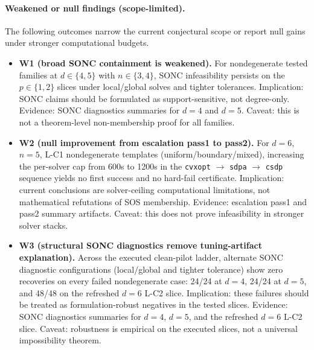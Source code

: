 \documentclass{article}
\begin{document}
\paragraph{Weakened or null findings (scope-limited).}
The following outcomes narrow the current conjectural scope or report null gains under stronger
computational budgets.
\begin{itemize}
    \item \textbf{W1 (broad SONC containment is weakened).}
    For nondegenerate tested families at $d\in\{4,5\}$ with $n\in\{3,4\}$,
    SONC infeasibility persists on the $p\in\{1,2\}$ slices under local/global solves and tighter
    tolerances.
    Implication: SONC claims should be formulated as support-sensitive, not degree-only.
    Evidence: SONC diagnostics summaries for $d=4$ and $d=5$.
    Caveat: this is not a theorem-level non-membership proof for all families.
    \item \textbf{W2 (null improvement from escalation pass1 to pass2).}
    For $d=6$, $n=5$, L-C1 nondegenerate templates (uniform/boundary/mixed),
    increasing the per-solver cap from 600s to 1200s in the
    \texttt{cvxopt} $\rightarrow$ \texttt{sdpa} $\rightarrow$ \texttt{csdp}
    sequence yields no first success and no hard-fail certificate.
    Implication: current conclusions are solver-ceiling computational limitations, not mathematical
    refutations of SOS membership.
    Evidence: escalation pass1 and pass2 summary artifacts.
    Caveat: this does not prove infeasibility in stronger solver stacks.
    \item \textbf{W3 (structural SONC diagnostics remove tuning-artifact explanation).}
    Across the executed clean-pilot ladder, alternate SONC diagnostic configurations
    (local/global and tighter tolerance) show zero recoveries on every failed nondegenerate case:
    24/24 at $d=4$, 24/24 at $d=5$, and 48/48 on the refreshed $d=6$ L-C2 slice.
    Implication: these failures should be treated as formulation-robust negatives in the tested slices.
    Evidence: SONC diagnostics summaries for $d=4$, $d=5$, and the refreshed $d=6$ L-C2 slice.
    Caveat: robustness is empirical on the executed slices, not a universal impossibility theorem.
\end{itemize}
\end{document}
